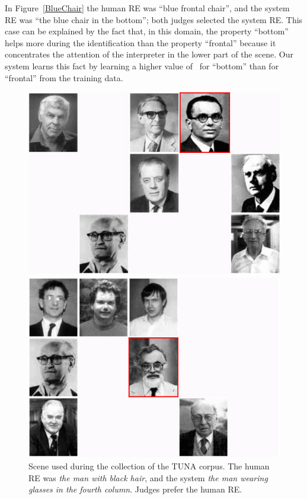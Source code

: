 In Figure~\ref{BlueChair} the human RE was ``blue frontal chair'', and the system RE was ``the blue chair in the bottom''; both judges selected the system RE. This case can be explained by the fact that, in this domain, the property ``bottom'' helps more during the identification than the property ``frontal'' because it concentrates the attention of the interpreter in the lower part of the scene. Our system learns this fact by learning a higher value of \puse~for ``bottom'' than for ``frontal'' from the training data. 

\begin{figure}[h]
\begin{minipage}{0.48\linewidth}
\centering
\includegraphics[width=\textwidth]{images/s59t26.jpg}
\caption{Scene used during the collection of the TUNA corpus. The human  RE was \emph{the man with black hair}, and the system \emph{the man wearing glasses in the fourth column}. Judges prefer the human RE.}
\label{s28t25}
\end{minipage}
\hspace*{.04cm}
\begin{minipage}{0.48\linewidth}
\centering
\includegraphics[width=\textwidth]{images/s315t21.jpg}

\end{minipage}
\end{figure}
